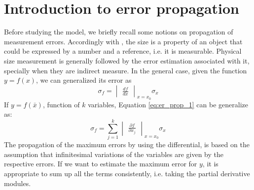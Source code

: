 \section{Introduction to error propagation}
Before studying the model, we briefly recall some notions on propagation of measurement errors. Accordingly with \cite{book:ivm}, the size is a property of an object that could be expressed by a number and a reference, i.e. it is measurable. Physical size measurement is generally followed by the error estimation associated with it, specially when they are indirect measure. In the general case, given the function $y = f(x)$, we can generalized its error as
  \begin{equation}
    \sigma_f = \begin{vmatrix}
      \frac{df}{dx}
    \end{vmatrix}_{x = x_0}
    \sigma_x
    \label{eq:er_prop_1}
  \end{equation}
If $y = f(\bar{x})$, function of $k$ variables, Equation \ref{eq:er_prop_1} can be generalize as:
  \begin{equation}
    \sigma_f = \sum_{j = 1}^k \begin{vmatrix}
      \frac{\partial f}{\partial x_j}
    \end{vmatrix}_{x = x_0}
    \sigma_x
    \label{eq:er_prop_2}
  \end{equation}
The propagation of the maximum errors by using the differential, is based on the assumption that infinitesimal variations of the variables are given by the respective errors. If we want to estimate the maximum error for $y$, it is appropriate to sum up all the terms consistently, i.e. taking the partial derivative modules.
